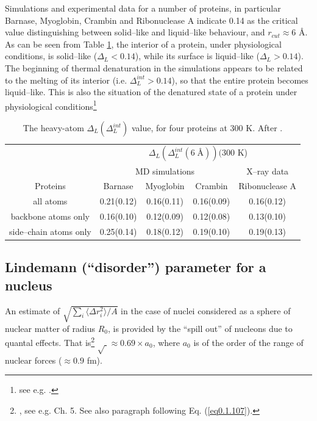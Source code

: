 \begin{subappendices}
Simulations and experimental data for a number of proteins, in particular Barnase, Myoglobin, Crambin and Ribonuclease A indicate 0.14 as the critical value distinguishing between solid--like and liquid--like behaviour, and $r_{cut}\approx 6$ \AA. As can be seen from Table \ref{tab2C1}, the interior of a protein, under physiological conditions, is solid--like  ($\Delta_L<0.14$), while its surface is liquid--like ($\Delta_L>0.14$). The beginning of thermal denaturation in the simulations appears to be related to the melting of its interior (i.e. $\Delta^{int}_L>0.14$), so that the entire protein becomes liquid--like. This is also the situation of the denatured state of a protein under physiological conditions\footnote{see e.g. \cite{Rosner:17}.} 



\begin{table}[h]
 \begin{tabular}{|c|c|c|c|c|}
 \hline
 &\multicolumn{4}{|c|}{$\Delta_L(\Delta_L^{int}(6\;\text{\AA}))(300$ K)}\\
 \cline{2-5}
 &\multicolumn{3}{|c|}{MD simulations}&X--ray data\\
 \hline
 Proteins&Barnase&Myoglobin&Crambin&Ribonuclease A\\
 \hline
 all atoms&0.21(0.12)&0.16(0.11)&0.16(0.09)&0.16(0.12)\\
 backbone atoms only&0.16(0.10)&0.12(0.09)&0.12(0.08)&0.13(0.10)\\
 side--chain atoms only&0.25(0.14)&0.18(0.12)&0.19(0.10)&0.19(0.13)\\
 \hline
 \end{tabular}
 \caption{The heavy-atom $\Delta_L(\Delta_L^{int})$ value, for four proteins at 300 K. After \cite{Zhou:99}.}\label{tab2C1}
 \end{table}

\subsection{Lindemann (``disorder'') parameter for a nucleus}
An estimate of  $\sqrt{\sum_i\langle \Delta r_i^2\rangle/A}$ in the case of nuclei considered as a sphere of nuclear matter of radius $R_0$, is provided by the ``spill out'' of nucleons due to quantal effects. That is\footnote{\cite{Bertsch:05}, see e.g. Ch. 5. See also paragraph following Eq. (\ref{eq0.1.107}).} $\sqrt{\;}\approx 0.69\times a_0$, where $a_0$ is of the order of the range of nuclear forces ($\approx 0.9$ fm).



\end{subappendices}
